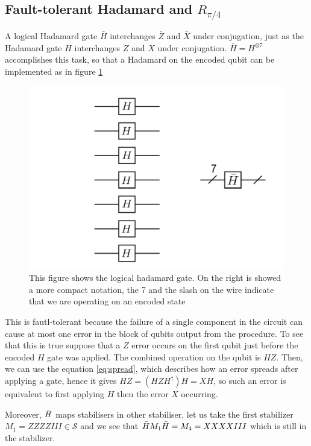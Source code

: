 \subsection*{Fault-tolerant Hadamard and $R_{\pi/4}$}
A logical Hadamard gate $\bar{H}$ interchanges $\bar{Z}$ and $\bar{X}$ under conjugation, just as the Hadamard gate $H$ interchanges $Z$ and $X$ under conjugation. $\bar{H}= H^{\otimes 7}$ accomplishes this task, so that a Hadamard on the encoded qubit can be implemented as in figure \ref{fig:logHada}
\begin{figure}[h!]
    \centering
    \includegraphics[scale=0.5]{Mainmatter/images/LogicalHadamard.png}
    \caption{This figure shows the logical hadamard gate. On the right is showed a more compact notation, the 7 and the slash on the wire indicate that we are operating on an encoded state}
    \label{fig:logHada}
\end{figure}

This is fautl-tolerant because the failure of a single component in the circuit can cause at most one error in the block of qubits output from the procedure. To see that this is true suppose that a $Z$ error occurs on the first qubit just before the encoded $H$ gate was applied. The combined operation on the qubit is $H Z$. Then, we can use the equation \ref{eq:spread}, which describes how an error spreads after applying a gate, hence it gives $H Z =(H Z H^{\dagger})H=X H$, so such an error is equivalent to first applying $H$ then the error $X$ occurring.

Moreover, $\Bar{H}$ maps stabilisers in other stabiliser, let us take the first stabilizer $M_1=ZZZZIII \in \mathcal{S}$ and we see that $\Bar{H} M_1 \Bar{H} = M_4 =XXXXIII $ which is still in the stabilizer. 

